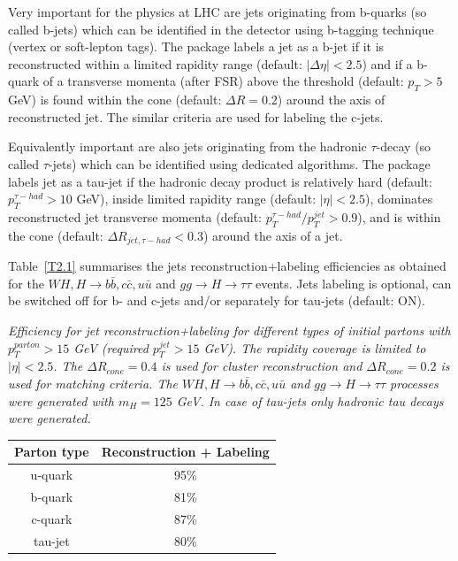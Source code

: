 Very important for the physics at LHC  are jets originating from b-quarks (so called
b-jets) which can be identified in the detector using b-tagging technique (vertex or
soft-lepton tags). The package labels a jet  as a b-jet if it is 
reconstructed within a limited rapidity
range (default: $|\Delta \eta| < 2.5$) and if a b-quark
of a transverse momenta (after FSR) above the threshold
(default: $p_T > 5$ GeV) is found within the cone 
(default: $\Delta R = 0.2$) around the axis of reconstructed jet.
The similar criteria are used for labeling the c-jets.

Equivalently important are also jets originating from the hadronic 
$\tau$-decay (so called $\tau$-jets) which can be identified using
dedicated algorithms.
The package labels jet as a tau-jet if the hadronic decay product is relatively
hard (default: $p_T^{\tau-had} > 10$ GeV), inside limited rapidity
range (default: $|\eta|<2.5$), dominates reconstructed jet transverse
momenta (default:  $p_T^{\tau-had}/p_T^{jet} > 0.9$), and is within
the cone (default: $\Delta R_{jet, \tau-had} < 0.3$) around the axis of a jet.  

Table~\ref{T2.1} summarises the jets reconstruction+labeling efficiencies as
obtained for the $WH, H \to b \bar b, c \bar c, u \bar u$ and
$gg \to H \to \tau \tau$ events.
Jets labeling is optional, can be switched off for b- and c-jets and/or separately
for tau-jets (default: ON).


\begin{Tabhere} 
\newcommand{\lstrut}{{$\strut\atop\strut$}}
  \caption {\em Efficiency for jet reconstruction+labeling for different types
  of initial partons with $p_T^{parton}> 15$ GeV (required 
  $p_T^{jet}> 15$ GeV). The rapidity coverage is limited to $|\eta| <2.5$.
  The $\Delta R_{cone}=0.4$ is used for cluster
  reconstruction and  $\Delta R_{cone}=0.2$ is used for matching
  criteria. The $WH, H \to b \bar b, c \bar c, u \bar u$ and $gg \to H
  \to \tau \tau$ processes were generated with $m_H = 125$ GeV.
In case of tau-jets only hadronic tau decays were generated.  
\label{T2.1}} 
\vspace{2mm}  
\begin{center}
\begin{tabular}{|c||c|} \hline \hline
Parton type & Reconstruction + Labeling  \\
\hline \hline
u-quark  &    95\%      \\
\hline
b-quark  &    81\%      \\
\hline
c-quark  &    87\%      \\
\hline
tau-jet  &    80\%      \\
\hline \hline
\end{tabular}
\end{center}
\end{Tabhere}


